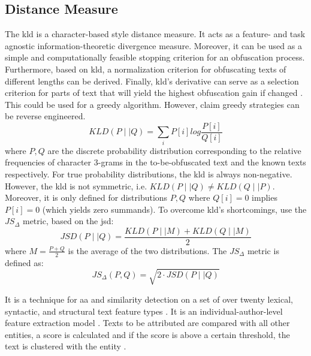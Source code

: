 \subsection{Distance Measure}
The \ac{kld} is a character-based style distance measure.
It acts as a feature- and task agnostic %
information-theoretic divergence measure.
Moreover, it can be used as a simple and computationally feasible stopping criterion for an obfuscation process.
Furthermore, based on \ac{kld}, a normalization criterion for obfuscating texts of different lengths can be derived.
Finally, \ac{kld}'s derivative can serve as a selection criterion for parts of text that 
will yield the highest obfuscation gain if changed \citep{bevendorff_divergence_based_2020}.
This could be used for a greedy algorithm.
However, \citet{bevendorff_divergence_based_2020} claim greedy strategies can be reverse engineered.
$$KLD(P\mid \mid Q) = \sum_{i}^{}P[i] log\frac{P[i]}{Q[i]}$$
where $P,Q$ are the discrete probability distribution corresponding to the relative frequencies of character 3-grams in the 
to-be-obfuscated text and the known texts respectively.
For true probability distributions, the \ac{kld} is always non-negative.
However, the \ac{kld} is not symmetric, i.e. $KLD(P\mid \mid Q) \neq KLD(Q\mid \mid P)$.
Moreover, it is only defined for distributions $P,Q$ where $Q[i] = 0$ implies $P[i] = 0$ (which yields zero summands).
To overcome \ac{kld}'s shortcomings, 
\citet{bevendorff_divergence_based_2020} use the $JS_\Delta$ metric, based on the \ac{jsd}:
$$JSD(P\mid \mid Q) = \frac{KLD(P\mid \mid M)+KLD(Q\mid \mid M)}{2}$$
where $M = \frac{P + Q}{2}$ is the average of the two distributions.
The $JS_\Delta$ metric is defined as:
$$JS_\Delta(P,Q) = \sqrt{2\cdot JSD(P\mid \mid Q)}$$

\begin{definition}
    [Writeprints]
    \label{def:writeprints}
    It is a technique for \ac{aa} and similarity detection \citep{elmanarelbouanani_authorship_2014,neal_surveying_2018} 
    on a set of over twenty lexical, syntactic, and structural text feature types \citep{bevendorff_divergence_based_2020}.
    It is an individual-author-level feature extraction model \citep{neal_surveying_2018}.
    Texts to be attributed are compared with all other entities, a score is calculated and if the score is above a certain threshold, 
    the text is clustered with the entity \citep{elmanarelbouanani_authorship_2014}.
\end{definition}

